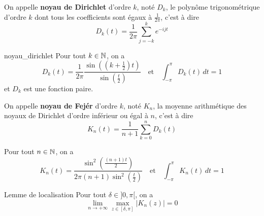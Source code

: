 \documentclass[a4paper, 12pt]{article}
\begin{document}
\begin{definition}
    On appelle \textbf{noyau de Dirichlet} d'ordre $k$, noté $D_k$, le polynôme trigonométrique d'ordre $k$ dont tous les coefficients sont égaux à $\frac{1}{2\pi}$, c'est à dire
    $$
    D_k(t) = \frac{1}{2\pi} \sum_{j=-k}^k e^{-ijt}
    $$
\end{definition}

\begin{proposition}{}{noyau_dirichlet}
    Pour tout $k \in \mathbb{N}$, on a
    $$
    D_k(t) = \frac{1}{2\pi} \frac{\sin((k + \frac{1}{2})t)}{\sin(\frac{t}{2})} \quad \text{et} \quad \int_{-\pi}^{\pi} D_k(t) \, dt = 1
    $$
    et $D_k$ est une fonction paire.

\end{proposition}

\begin{definition}
    On appelle \textbf{noyau de Fejér} d'ordre $k$, noté $K_n$, la moyenne arithmétique des noyaux de Dirichlet d'ordre inférieur ou égal à $n$, c'est à dire
    $$
    K_n(t) = \frac{1}{n + 1} \sum_{k=0}^n D_k(t)
    $$
\end{definition}

\begin{proposition}{}{}
    Pour tout $n \in \mathbb{N}$, on a
    $$
    K_n(t) = \frac{\sin^2(\frac{(n + 1)t}{2})}{2\pi (n + 1) \sin^2(\frac{t}{2})} \quad \text{et} \quad \int_{-\pi}^{\pi} K_n(t) \, dt = 1
    $$
\end{proposition}

\begin{lemme}{Lemme de localisation}{}
    Pour tout $\delta \in ]0, \pi[$, on a
    $$
    \lim_{n \to +\infty} \max_{z \in [\delta, \pi]} |K_n(z)| = 0
    $$
\end{lemme}
\end{document}

